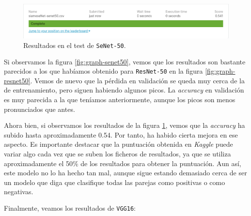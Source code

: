 \documentclass[11pt,a4paper]{article}
\begin{document}
\begin{figure}[H]
    \centering
    \includegraphics[scale=0.55]{img/siameseNet-senet50.png}
    \caption{Resultados en el test de \texttt{SeNet-50}.}
    \label{fig:test-senet50}
\end{figure}

Si observamos la figura \ref{fig:graph-senet50}, vemos que los resultados son bastante parecidos a los que
habíamos obtenido para \texttt{ResNet-50} en la figura \ref{fig:graph-resnet50}. Vemos de nuevo que la pérdida
en validación se queda muy cerca de la de entrenamiento, pero siguen habiendo algunos picos. La \textit{accuracy}
en validación es muy parecida a la que teníamos anteriormente, aunque los picos son menos pronunciados que antes.

Ahora bien, si observamos los resultados de la figura \ref{fig:test-senet50}, vemos que la \textit{accuracy}
ha subido hasta aproximadamente 0.54. Por tanto, ha habido cierta mejora en ese aspecto. Es importante
destacar que la puntuación obtenida en \textit{Kaggle} puede variar algo cada vez que se suben los ficheros
de resultados, ya que se utiliza aproximadamente el 50\% de los resultados para obtener la puntuación. Aun así,
este modelo no lo ha hecho tan mal, aunque sigue estando demasiado cerca de ser un modelo que diga que clasifique
todas las parejas como positivas o como negativas.

Finalmente, veamos los resultados de \texttt{VGG16}:
\end{document}
